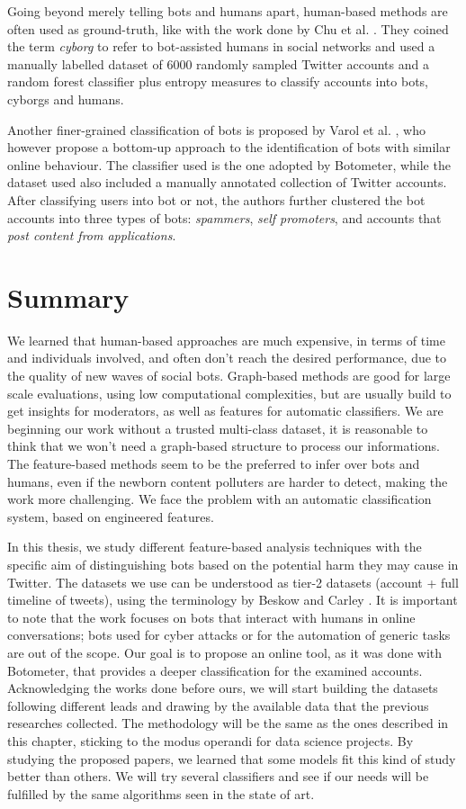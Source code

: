 Going beyond merely telling bots and humans apart, human-based methods are often used as ground-truth, like with the work done by Chu et al. \cite{Cyborgs}. They coined the term \emph{cyborg} to refer to bot-assisted humans in social networks and used a manually labelled dataset of 6000 randomly sampled Twitter accounts and a random forest classifier plus entropy measures to classify accounts into bots, cyborgs and humans.

Another finer-grained classification of bots is proposed by Varol et al. \cite{Varol}, who however propose a bottom-up approach to the identification of bots with similar online behaviour. The classifier used is the one adopted by Botometer, while the dataset used also included a manually annotated collection of Twitter accounts. After classifying users into bot or not, the authors further clustered the bot accounts into three types of bots: \emph{spammers}, \textit{self promoters}, and accounts that \textit{post content from applications}.

\section{Summary}
We learned that human-based approaches are much expensive, in terms of time and individuals involved, and often don't reach the desired performance, due to the quality of new waves of social bots.
Graph-based methods are good for large scale evaluations, using low computational complexities, but are usually build to get insights for moderators, as well as features for automatic classifiers.
We are beginning our work without a trusted multi-class dataset, it is reasonable to think that we won't need a graph-based structure to process our informations.
The feature-based methods seem to be the preferred to infer over bots and humans, even if the newborn content polluters are harder to detect, making the work more challenging.
We face the problem with an automatic classification system, based on engineered features.

In this thesis, we study different feature-based analysis techniques with the specific aim of distinguishing bots based on the potential harm they may cause in Twitter. The datasets we use can be understood as tier-2 datasets (account + full timeline of tweets), using the terminology by Beskow and Carley \cite{Bot-Hunter}. It is important to note that the work focuses on bots that interact with humans in online conversations; bots used for cyber attacks or for the automation of generic tasks are out of the scope. Our goal is to propose an online tool, as it was done with Botometer, that provides a deeper classification for the examined accounts. Acknowledging the works done before ours, we will start building the datasets following different leads and drawing by the available data that the previous researches collected. The methodology will be the same as the ones described in this chapter, sticking to the modus operandi for data science projects.
By studying the proposed papers, we learned that some models fit this kind of study better than others. We will try several classifiers and see if our needs will be fulfilled by the same algorithms seen in the state of art. 

